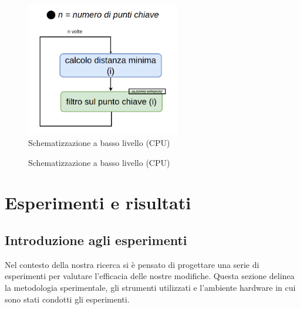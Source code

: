 \documentclass[12pt,a4paper]{report}
\begin{document}
\begin{figure}[h]
    \centering
    \includegraphics[width=0.6\textwidth]{img/sliding_window_high.png}
    \caption{Schematizzazione a basso livello (CPU) }
\end{figure}

\begin{figure}[h]
    \centering
    \caption{Schematizzazione a basso livello (CPU) }
\end{figure}


\chapter{Esperimenti e risultati}

\section{Introduzione agli esperimenti}

Nel contesto della nostra ricerca si è pensato di progettare una serie di esperimenti per valutare l'efficacia delle nostre modifiche. Questa sezione delinea la metodologia sperimentale, gli strumenti utilizzati e l'ambiente hardware in cui sono stati condotti gli esperimenti.
\end{document}
